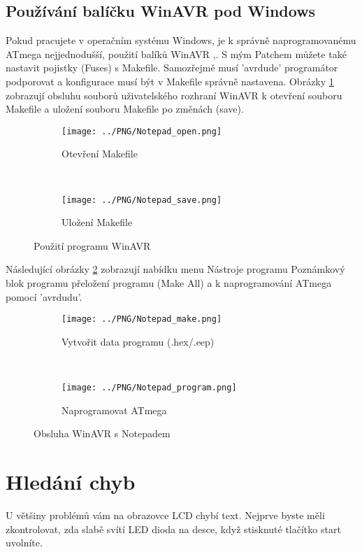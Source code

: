 \subsection{Používání balíčku WinAVR pod Windows}
Pokud pracujete v operačním systému Windows, je k správně naprogramovanému ATmega nejjednodušší,
použití balíků WinAVR \cite{winavr1},\cite{winavr2}.
S mým Patchem \cite{winavr3} můžete také nastavit pojistky (Fuses) s Makefile. Samozřejmě musí 'avrdude' programátor podporovat a konfigurace musí být v Makefile správně nastavena.
Obrázky \ref{fig:WinAVR1} zobrazují obsluhu souborů uživatelského rozhraní WinAVR k otevření souboru Makefile a uložení souboru Makefile po změnách (save).
\begin{figure}[H]
  \begin{subfigure}[b]{.5\textwidth}
    \centering
    \texttt{[image: ../PNG/Notepad\_open.png]}
    \caption{Otevření Makefile}
  \end{subfigure}
  ~
  \begin{subfigure}[b]{.5\textwidth}
    \centering
    \texttt{[image: ../PNG/Notepad\_save.png]}
    \caption{Uložení Makefile}
  \end{subfigure}
  \caption{Použití programu WinAVR}
  \label{fig:WinAVR1}
\end{figure}

Následující obrázky \ref{fig:WinAVR2} zobrazují nabídku menu Nástroje programu Poznámkový blok
programu přeložení programu (Make All) a k naprogramování ATmega pomocí 'avrdudu'.

\begin{figure}[H]
  \begin{subfigure}[b]{.5\textwidth}
    \centering
    \texttt{[image: ../PNG/Notepad\_make.png]}
    \caption{Vytvořit data programu (.hex/.eep)}
  \end{subfigure}
  ~
  \begin{subfigure}[b]{.5\textwidth}
    \centering
    \texttt{[image: ../PNG/Notepad\_program.png]}
    \caption{Naprogramovat ATmega}
  \end{subfigure}
  \caption{Obsluha WinAVR s Notepadem}
  \label{fig:WinAVR2}
\end{figure}

\section{Hledání chyb}
U většiny problémů vám na obrazovce LCD chybí text.
Nejprve byste měli zkontrolovat, zda slabě svítí LED dioda na desce, když stisknuté tlačítko start
uvolníte.

